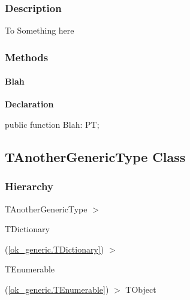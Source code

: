 \documentclass{report}
\newif\ifpdf
\begin{document}
\subsubsection*{\large{\textbf{Description}}\normalsize\hspace{1ex}\hfill}
To Something here\subsubsection*{\large{\textbf{Methods}}\normalsize\hspace{1ex}\hfill}
\paragraph*{Blah}\hspace*{\fill}

\label{ok_generic.TMyNewGeneric-Blah}
\begin{list}{}{
\setlength{\itemindent}{0cm}
\setlength{\listparindent}{0cm}
\setlength{\leftmargin}{\evensidemargin}
\addtolength{\leftmargin}{\tmplength}
\settowidth{\labelsep}{X}
\addtolength{\leftmargin}{\labelsep}
\setlength{\labelwidth}{\tmplength}
}
\item[\textbf{Declaration}\hfill]
\ifpdf
\begin{flushleft}
\fi
\begin{ttfamily}
public function Blah: PT;\end{ttfamily}

\ifpdf
\end{flushleft}
\fi

\end{list}
\ifpdf
\subsection*{\large{\textbf{TAnotherGenericType Class}}\normalsize\hspace{1ex}\hrulefill}
\else
\subsection*{TAnotherGenericType Class}
\fi
\label{ok_generic.TAnotherGenericType}
\subsubsection*{\large{\textbf{Hierarchy}}\normalsize\hspace{1ex}\hfill}
TAnotherGenericType {$>$} \begin{ttfamily}TDictionary\end{ttfamily}(\ref{ok_generic.TDictionary}) {$>$} \begin{ttfamily}TEnumerable\end{ttfamily}(\ref{ok_generic.TEnumerable}) {$>$} 
TObject
\end{document}
